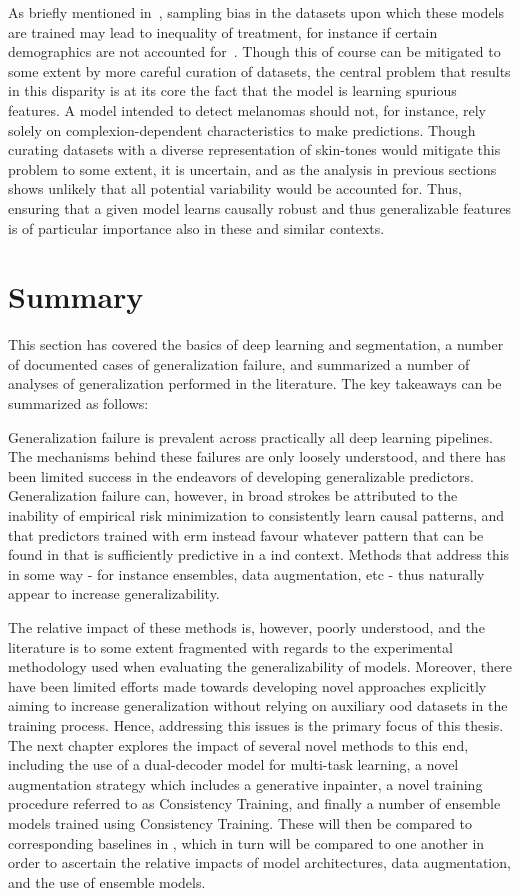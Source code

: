     As briefly mentioned in~, sampling bias in the datasets upon which these models are trained may lead to inequality of treatment, for instance if certain demographics are not accounted for~\cite{social_consequence_1}. Though this of course can be mitigated to some extent by more careful curation of datasets, the central problem that results in this disparity is at its core the fact that the model is learning spurious features. A model intended to detect melanomas should not, for instance, rely solely on complexion-dependent characteristics to make predictions. Though curating datasets with a diverse representation of skin-tones would mitigate this problem to some extent, it is uncertain, and as the analysis in previous sections shows unlikely that all potential variability would be accounted for. Thus, ensuring that a given model learns causally robust and thus generalizable features is of particular importance also in these and similar contexts. 
    
    
\section{Summary}
This section has covered the basics of deep learning and segmentation, a number of documented cases of generalization failure, and summarized a number of analyses of generalization performed in the literature. The key takeaways can be summarized as follows: 

Generalization failure is prevalent across practically all deep learning pipelines. The mechanisms behind these failures are only loosely understood, and there has been limited success in the endeavors of developing generalizable predictors. Generalization failure can, however, in broad strokes be attributed to the inability of empirical risk minimization to consistently learn causal patterns, and that predictors trained with \gls{erm} instead favour whatever pattern that can be found in that is sufficiently predictive in a \gls{ind} context. Methods that address this in some way - for instance ensembles, data augmentation, etc - thus naturally appear to increase generalizability. 

The relative impact of these methods is, however, poorly understood, and the literature is to some extent fragmented with regards to the experimental methodology used when evaluating the generalizability of models. Moreover, there have been limited efforts made towards developing novel approaches explicitly aiming to increase generalization without relying on auxiliary \gls{ood} datasets in the training process. Hence, addressing this issues is the primary focus of this thesis. The next chapter explores the impact of several novel methods to this end, including the use of a dual-decoder model for multi-task learning, a novel augmentation strategy which includes a generative inpainter, a novel training procedure referred to as Consistency Training, and finally a number of ensemble models trained using Consistency Training. These will then be compared to corresponding baselines in , which in turn will be compared to one another in order to ascertain the relative impacts of model architectures, data augmentation, and the use of ensemble models. 


